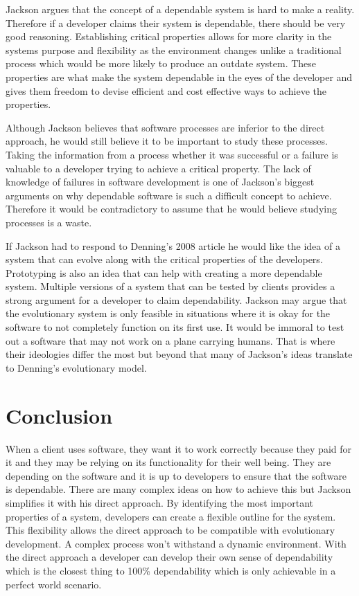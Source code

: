 \documentclass[11pt]{article}
\begin{document}
\begin{doublespace}
  Jackson argues that the concept of a dependable system is hard to make a reality. Therefore if a developer claims their system is dependable, there should be very good reasoning. Establishing critical properties allows for more clarity in the systems purpose and flexibility as the environment changes unlike a traditional process which would be more likely to produce an outdate system. These properties are what make the system dependable in the eyes of the developer and gives them freedom to devise efficient and cost effective ways to achieve the properties.
  
  Although Jackson believes that software processes are inferior to the direct approach, he would still believe it to be important to study these processes. Taking the information from a process whether it was successful or a failure is valuable to a developer trying to achieve a critical property. The lack of knowledge of failures in software development is one of Jackson's biggest arguments on why dependable software is such a difficult concept to achieve\cite{jackson2009}. Therefore it would be contradictory to assume that he would believe studying processes is a waste.
  
  If Jackson had to respond to Denning's 2008 article he would like the idea of a system that can evolve along with the critical properties of the developers\cite{denning2008}. Prototyping is also an idea that can help with creating a more dependable system. Multiple versions of a system that can be tested by clients provides a strong argument for a developer to claim dependability. Jackson may argue that the evolutionary system is only feasible in situations where it is okay for the software to not completely function on its first use\cite{beck124}. It would be immoral to test out a software that may not work on a plane carrying humans. That is where their ideologies differ the most but beyond that many of Jackson's ideas translate to Denning's evolutionary model.

  \section{Conclusion}
 
 When a client uses software, they want it to work correctly because they paid for it and they may be relying on its functionality for their well being. They are depending on the software and it is up to developers to ensure that the software is dependable. There are many complex ideas on how to achieve this but Jackson simplifies it with his direct approach. By identifying the most important properties of a system, developers can create a flexible outline for the system. This flexibility allows the direct approach to be compatible with evolutionary development. A complex process won't withstand a dynamic environment. With the direct approach a developer can develop their own sense of dependability which is the closest thing to 100\% dependability which is only achievable in a perfect world scenario.
  

\end{doublespace}



\end{document}
